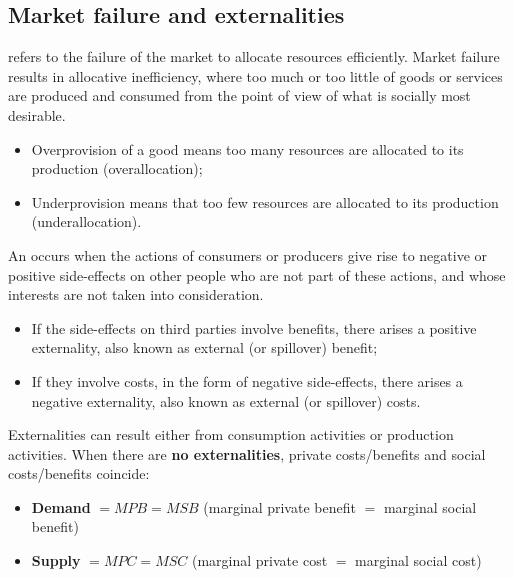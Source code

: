 \subsection{Market failure and externalities}
 refers to the failure of the market to allocate resources efficiently. Market failure results in allocative inefficiency, where too much or too little of goods or services are produced and consumed from the point of view of what is socially most desirable. 
\begin{itemize}
  \item Overprovision of a good means too many resources are allocated to its production (overallocation);
  \item Underprovision means that too few resources are allocated to its production (underallocation).
\end{itemize}
An  occurs when the actions of consumers or producers give rise to negative or positive side-effects on other people who are not part of these actions, and whose interests are not taken into consideration. 
\begin{itemize}
  \item If the side-effects on third parties involve benefits, there arises a positive externality, also known as external (or spillover) benefit;
  \item If they involve costs, in the form of negative side-effects, there arises a negative externality, also known as external (or spillover) costs. 
\end{itemize} 
Externalities can result either from consumption activities or production activities.
When there are \textbf{no externalities}, private costs/benefits and social costs/benefits coincide:
\begin{itemize}
  \item \textbf{Demand} $= MPB = MSB$ (marginal private benefit $=$ marginal social benefit)
  \item \textbf{Supply} $= MPC = MSC$ (marginal private cost $=$ marginal social cost)
\end{itemize}


